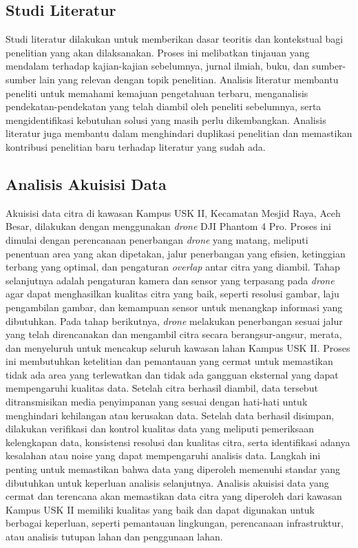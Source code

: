 \subsection{Studi Literatur}
Studi literatur dilakukan untuk memberikan dasar teoritis dan kontekstual bagi penelitian yang akan dilaksanakan. Proses ini melibatkan tinjauan yang mendalam terhadap kajian-kajian sebelumnya, jurnal ilmiah, buku, dan sumber-sumber lain yang relevan dengan topik penelitian. Analisis literatur membantu peneliti untuk memahami kemajuan pengetahuan terbaru, menganalisis pendekatan-pendekatan yang telah diambil oleh peneliti sebelumnya, serta mengidentifikasi kebutuhan solusi yang masih perlu dikembangkan. Analisis literatur juga membantu dalam menghindari duplikasi penelitian dan memastikan kontribusi penelitian baru terhadap literatur yang sudah ada.

\subsection{Analisis Akuisisi Data}
Akuisisi data citra di kawasan Kampus USK II, Kecamatan Mesjid Raya, Aceh Besar, dilakukan dengan menggunakan \textit{drone} DJI Phantom 4 Pro. Proses ini dimulai dengan perencanaan penerbangan \textit{drone} yang matang, meliputi penentuan area yang akan dipetakan, jalur penerbangan yang efisien, ketinggian terbang yang optimal, dan pengaturan \textit{overlap} antar citra yang diambil. Tahap selanjutnya adalah pengaturan kamera dan sensor yang terpasang pada \textit{drone} agar dapat menghasilkan kualitas citra yang baik, seperti resolusi gambar, laju pengambilan gambar, dan kemampuan sensor untuk menangkap informasi yang dibutuhkan. Pada tahap berikutnya, \textit{drone} melakukan penerbangan sesuai jalur yang telah direncanakan dan mengambil citra secara berangsur-angsur, merata, dan menyeluruh untuk mencakup seluruh kawasan lahan Kampus USK II. Proses ini membutuhkan ketelitian dan pemantauan yang cermat untuk memastikan tidak ada area yang terlewatkan dan tidak ada gangguan eksternal yang dapat mempengaruhi kualitas data. Setelah citra berhasil diambil, data tersebut ditransmisikan media penyimpanan yang sesuai dengan hati-hati untuk menghindari kehilangan atau kerusakan data. Setelah data berhasil disimpan, dilakukan verifikasi dan kontrol kualitas data yang meliputi pemeriksaan kelengkapan data, konsistensi resolusi dan kualitas citra, serta identifikasi adanya kesalahan atau noise yang dapat mempengaruhi analisis data. Langkah ini penting untuk memastikan bahwa data yang diperoleh memenuhi standar yang dibutuhkan untuk keperluan analisis selanjutnya. Analisis akuisisi data yang cermat dan terencana akan memastikan data citra yang diperoleh dari kawasan Kampus USK II memiliki kualitas yang baik dan dapat digunakan untuk berbagai keperluan, seperti pemantauan lingkungan, perencanaan infrastruktur, atau analisis tutupan lahan dan penggunaan lahan.

